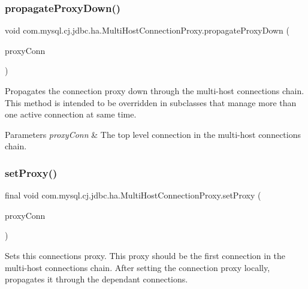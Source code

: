 \subsubsection{\texorpdfstring{propagate\+Proxy\+Down()}{propagateProxyDown()}}
{\footnotesize\ttfamily void com.\+mysql.\+cj.\+jdbc.\+ha.\+Multi\+Host\+Connection\+Proxy.\+propagate\+Proxy\+Down (\begin{DoxyParamCaption}\item[{\mbox{\hyperlink{interfacecom_1_1mysql_1_1cj_1_1jdbc_1_1_jdbc_connection}{Jdbc\+Connection}}}]{proxy\+Conn }\end{DoxyParamCaption})\hspace{0.3cm}{\ttfamily [protected]}}

Propagates the connection proxy down through the multi-\/host connections chain. This method is intended to be overridden in subclasses that manage more than one active connection at same time.


\begin{DoxyParams}{Parameters}
{\em proxy\+Conn} & The top level connection in the multi-\/host connections chain. \\
\hline
\end{DoxyParams}
\mbox{\label{classcom_1_1mysql_1_1cj_1_1jdbc_1_1ha_1_1_multi_host_connection_proxy_a14df65af9560d49c9ee1f9c3ea2da376}} 
\subsubsection{\texorpdfstring{set\+Proxy()}{setProxy()}}
{\footnotesize\ttfamily final void com.\+mysql.\+cj.\+jdbc.\+ha.\+Multi\+Host\+Connection\+Proxy.\+set\+Proxy (\begin{DoxyParamCaption}\item[{\mbox{\hyperlink{interfacecom_1_1mysql_1_1cj_1_1jdbc_1_1_jdbc_connection}{Jdbc\+Connection}}}]{proxy\+Conn }\end{DoxyParamCaption})\hspace{0.3cm}{\ttfamily [protected]}}

Sets this connection\textquotesingle{}s proxy. This proxy should be the first connection in the multi-\/host connections chain. After setting the connection proxy locally, propagates it through the dependant connections.


